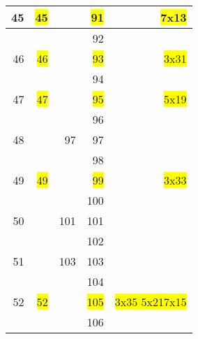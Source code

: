 \begin{tabular}{|r|r|r|r|r|}
    \hline               45             &   \colorbox{yellow}{45}&         &     \colorbox{yellow}{91}    &     \colorbox{yellow}{7x13  }  \\
    \hline                              &                        &         &     92    &                                \\
    \hline               46             &   \colorbox{yellow}{46}&         &    \colorbox{yellow}{93}    &     \colorbox{yellow}{3x31  }  \\
    \hline                              &                        &         &     94    &                                \\
    \hline               47             &   \colorbox{yellow}{47}&         &     \colorbox{yellow}{95}    &     \colorbox{yellow}{5x19  }  \\
    \hline                              &                        &         &     96    &                                \\
    \hline               48             &                        &     97  &     97    &                                \\
    \hline                              &                        &         &     98    &                                \\
    \hline               49             &   \colorbox{yellow}{49}&         &     \colorbox{yellow}{99}    &     \colorbox{yellow}{3x33  }  \\
    \hline                              &                        &         &    100    &                                \\
    \hline               50             &                        &    101  &    101    &                                \\
    \hline                              &                        &         &    102    &                                \\
    \hline               51             &                        &    103  &    103    &                                \\
    \hline                              &                        &         &    104    &                                \\
    \hline               52             &   \colorbox{yellow}{52}&         &    \colorbox{yellow}{105}    &\colorbox{yellow}{3x35 5x217x15}\\
    \hline                              &                        &         &    106    &                                \\

\end{tabular}
